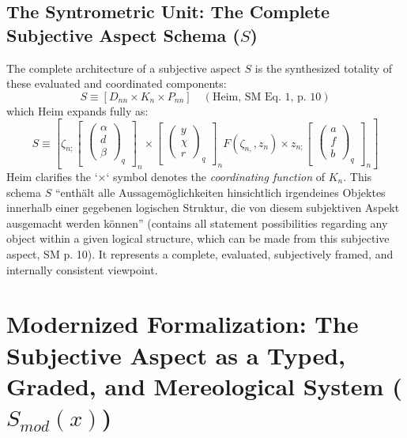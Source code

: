 \documentclass[
    12pt,              %
    a4paper,           %
    headings=normal,   %
    twoside=true,      %
    BCOR=8mm,          %
]{scrbook}
\newcommand{\q}[1]{\enquote{#1}}
\newcommand{\subjektiveraspekt}{S}
\begin{document}
\subsection{\texorpdfstring{The Syntrometric Unit: The Complete Subjective Aspect Schema (\(S\))}{The Syntrometric Unit: The Complete Subjective Aspect Schema (S)}}
\label{sec:ch1_complete_aspect_schema}
The complete architecture of a subjective aspect \(\subjektiveraspekt\) is the synthesized totality of these evaluated and coordinated components:
\begin{equation} \label{eq:original_subjective_aspect} 
S \equiv \left[ D_{nn} \times K_n \times P_{nn} \right] \quad (\text{Heim, SM Eq. 1, p. 10})
\end{equation}
which Heim expands fully as:
\[ \subjektiveraspekt \equiv \left[ \zeta_{n;} \begin{bmatrix} \begin{pmatrix} \alpha \\ d \\ \beta \end{pmatrix}_q \end{bmatrix}_n \times \begin{bmatrix} \begin{pmatrix} y \\ \chi \\ r \end{pmatrix}_q \end{bmatrix}_n F(\zeta_{n,}, z_n) \times z_{n;} \begin{bmatrix} \begin{pmatrix} a \\ f \\ b \end{pmatrix}_q \end{bmatrix}_n \right] \]
Heim clarifies the `×` symbol denotes the \textit{coordinating function} of \(K_n\). This schema \(\subjektiveraspekt\) \q{enthält alle Aussagemöglichkeiten hinsichtlich irgendeines Objektes innerhalb einer gegebenen logischen Struktur, die von diesem subjektiven Aspekt ausgemacht werden können} (contains all statement possibilities regarding any object within a given logical structure, which can be made from this subjective aspect, SM p. 10). It represents a complete, evaluated, subjectively framed, and internally consistent viewpoint.

\section{\texorpdfstring{Modernized Formalization: The Subjective Aspect as a Typed, Graded, and Mereological System (\(S_{mod}(x)\))}{Modernized Formalization: The Subjective Aspect as a Typed, Graded, and Mereological System (S mod(x))}}
\label{sec:ch1_modernized_formalization} %
\end{document}
